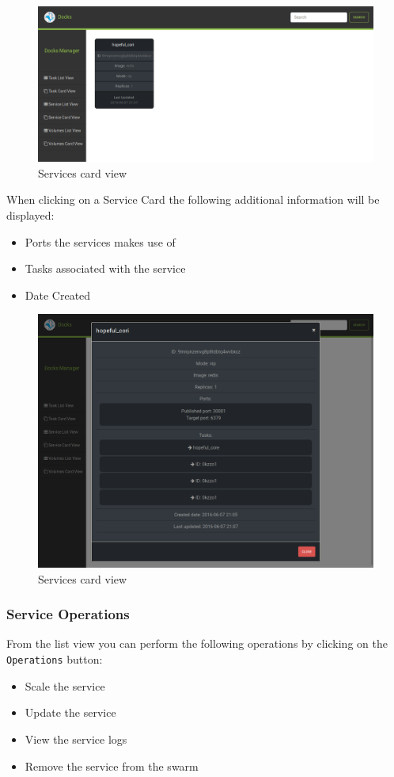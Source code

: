 \documentclass[]{article}
\providecommand{\tightlist}{%
	\setlength{\itemsep}{0pt}\setlength{\parskip}{0pt}}
\let\oldtexttt\texttt
\renewcommand{\texttt}[1]{
	\colorbox{Light}{\oldtexttt{#1}}
}
\begin{document}
\begin{figure}[H]
	\centering
	\includegraphics[scale=0.4]{service_card_view.png}
	\caption{Services card view}
\end{figure}

When clicking on a Service Card the following additional information will be displayed:
\begin{itemize}
	\tightlist
	\item Ports the services makes use of
	\item Tasks associated with the service
	\item Date Created
\end{itemize}

\begin{figure}[H]
	\centering
	\includegraphics[scale=0.4]{service_card_modal.png}
	\caption{Services card view}
\end{figure}

\subsubsection{Service Operations}
From the list view you can perform the following operations by clicking on the \texttt{Operations} button:
\begin{itemize}
	\tightlist
	\item Scale the service
	\item Update the service
	\item View the service logs
	\item Remove the service from the swarm
\end{itemize}
\end{document}

